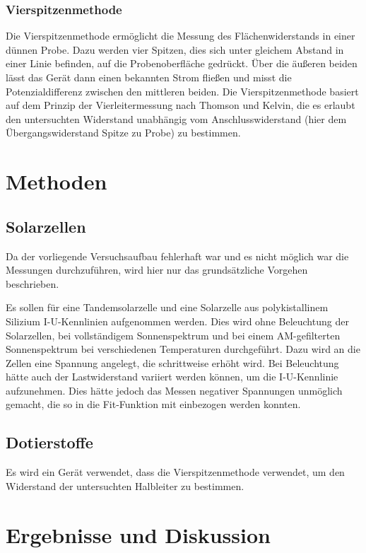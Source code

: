 \documentclass[
	a4paper,
	12pt,
	pagesize,
	ngerman
]{scrartcl}
\begin{document}
	\subsubsection{Vierspitzenmethode}
	Die Vierspitzenmethode ermöglicht die Messung des Flächenwiderstands in einer dünnen Probe.
	Dazu werden vier Spitzen, dies sich unter gleichem Abstand in einer Linie befinden, auf die Probenoberfläche gedrückt.
	Über die äußeren beiden lässt das Gerät dann einen bekannten Strom fließen und misst die Potenzialdifferenz zwischen den mittleren beiden.
	Die Vierspitzenmethode basiert auf dem Prinzip der Vierleitermessung nach Thomson und Kelvin, die es erlaubt den untersuchten Widerstand unabhängig vom Anschlusswiderstand (hier dem Übergangswiderstand Spitze zu Probe) zu bestimmen.

	\section{Methoden}
	\subsection{Solarzellen}
	Da der vorliegende Versuchsaufbau fehlerhaft war und es nicht möglich war die Messungen durchzuführen, wird hier nur das grundsätzliche Vorgehen beschrieben.

	Es sollen für eine Tandemsolarzelle und eine Solarzelle aus polykistallinem Silizium I-U-Kennlinien aufgenommen werden.
	Dies wird ohne Beleuchtung der Solarzellen, bei vollständigem Sonnenspektrum und bei einem AM-gefilterten Sonnenspektrum bei verschiedenen Temperaturen durchgeführt.
	Dazu wird an die Zellen eine Spannung angelegt, die schrittweise erhöht wird.
	Bei Beleuchtung hätte auch der Lastwiderstand variiert werden können, um die I-U-Kennlinie aufzunehmen.
	Dies hätte jedoch das Messen negativer Spannungen unmöglich gemacht, die so in die Fit-Funktion mit einbezogen werden konnten.

	\subsection{Dotierstoffe}
	Es wird ein Gerät verwendet, dass die Vierspitzenmethode verwendet, um den Widerstand der untersuchten Halbleiter zu bestimmen.



	\section{Ergebnisse und Diskussion}
\end{document}
